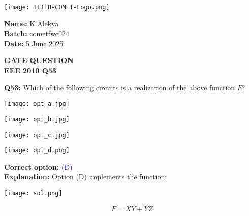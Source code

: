 \documentclass[a4paper,12pt]{article}
\begin{document}
\begin{minipage}{0.6\textwidth}
    \texttt{[image: IIITB-COMET-Logo.png]} %
\end{minipage}
\hfill
\begin{minipage}{0.35\textwidth}
\raggedleft
\textbf{Name:} K.Alekya \\
\textbf{Batch:} cometfwc024 \\
\textbf{Date:} 5 June 2025
\end{minipage}
\begin{center}
    {\color{cyan} \LARGE \textbf{GATE QUESTION}}\\
    {\color{cyan} \Large \textbf{EEE 2010 Q53}}
\end{center}

\textbf{Q53:} Which of the following circuits is a realization of the above function \( F \)?
\vspace{1em}
\vspace{1em}

\begin{center}
\texttt{[image: opt\_a.jpg]}
\end{center}

\vspace{1em}

\begin{center}
\texttt{[image: opt\_b.jpg]}

\end{center}

\vspace{1em}

\begin{center}
\texttt{[image: opt\_c.jpg]}

\end{center}

\vspace{1em}

\begin{center}
\texttt{[image: opt\_d.png]}
\end{center}
\vspace{1em}

\noindent\textbf{Correct option:} \textcolor{blue}{(D)} \\
\textbf{Explanation:} Option (D) implements the function:
\begin{center}
\texttt{[image: sol.png]}
\end{center}
\[
F = \overline{X}Y + YZ
\]
\end{document}
